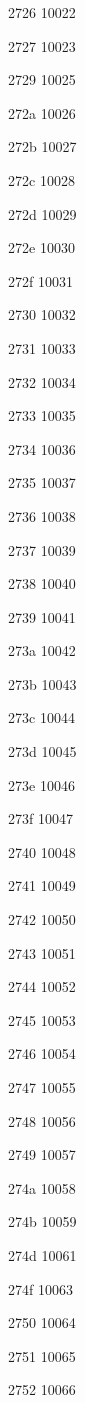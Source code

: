 \documentclass[11pt]{article}
\begin{document}
2726 10022 

2727 10023 

2729 10025 

272a 10026 

272b 10027 

272c 10028 

272d 10029 

272e 10030 

272f 10031 

2730 10032 

2731 10033 

2732 10034 

2733 10035 

2734 10036 

2735 10037 

2736 10038 

2737 10039 

2738 10040 

2739 10041 

273a 10042 

273b 10043 

273c 10044 

273d 10045 

273e 10046 

273f 10047 

2740 10048 

2741 10049 

2742 10050 

2743 10051 

2744 10052 

2745 10053 

2746 10054 

2747 10055 

2748 10056 

2749 10057 

274a 10058 

274b 10059 

274d 10061 

274f 10063 

2750 10064 

2751 10065 

2752 10066 
\end{document}
